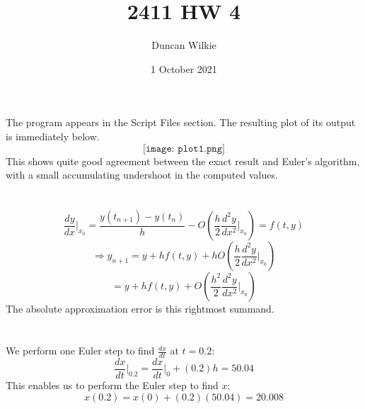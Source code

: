 \documentclass{article}
\title{2411 HW 4}
\author{Duncan Wilkie}
\date{1 October 2021}
\begin{document}
\maketitle

\section{}
The program appears in the Script Files section. The resulting plot of its output is immediately below.
\[\texttt{[image: plot1.png]}\]
This shows quite good agreement between the exact result and Euler's algorithm, with a small accumulating undershoot in the computed values.

\section{}
\[\frac{dy}{dx}\bigg|_{x_0} = \frac{y(t_{n+1})-y(t_n)}{h}-O\left(\frac{h}{2}\frac{d^2y}{dx^2}\bigg|_{x_0}\right)=f(t,y)\]
\[\Rightarrow y_{n+1}=y+hf(t,y) + hO\left(\frac{h}{2}\frac{d^2y}{dx^2}\bigg|_{x_0}\right)\]
\[= y+hf(t,y) + O\left(\frac{h^2}{2}\frac{d^2y}{dx^2}\bigg|_{x_0}\right)\]
The absolute approximation error is this rightmost summand.

\section{}
We perform one Euler step to find $\frac{dx}{dt}$ at $t=0.2$:
\[\frac{dx}{dt}\bigg|_{0.2}=\frac{dx}{dt}\bigg|_{0}+(0.2)h=50.04\]
This enables us to perform the Euler step to find $x$:
\[x(0.2)=x(0)+(0.2)(50.04)=20.008\]
\end{document}
